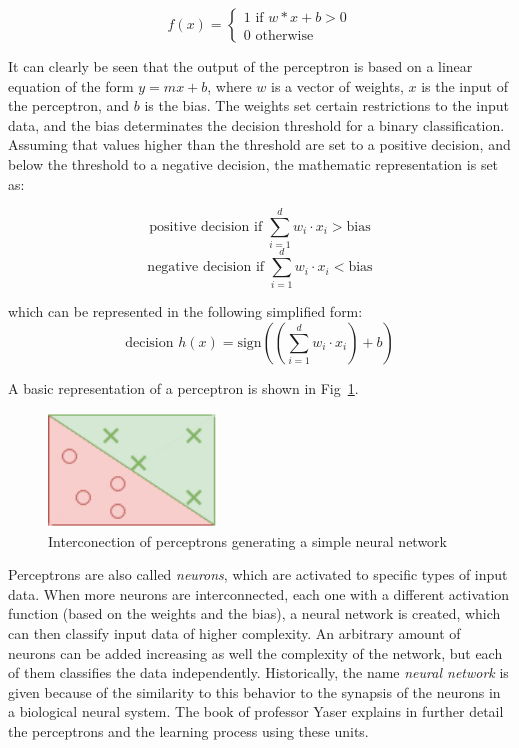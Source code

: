 \begin{equation}
    f(x) =
    \begin{cases}
        1 \text{ if } w*x + b > 0\\
        0 \text{ otherwise}
    \end{cases}
\end{equation}

It can clearly be seen that the output of the perceptron is based on a linear equation of the form \(y=mx+b\), where \(w\)  is a vector of weights, \(x\) is the input of the perceptron, and \(b\) is the bias. The weights set certain restrictions to the input data, and the bias determinates the decision threshold for a binary classification. Assuming that values higher than the threshold are set to a positive decision, and below the threshold to a negative decision, the mathematic representation is set as:

\begin{equation}
    \text{positive decision if } \sum_{i=1}^{d} w_i\cdot x_i > \text{bias}
\end{equation}
\begin{equation}
    \text{negative decision if } \sum_{i=1}^{d} w_i\cdot x_i < \text{bias}
\end{equation}

which can be represented in the following simplified form:
\begin{equation}
    \text{decision } h(x) = \text{sign}\left(  \left( \sum_{i=1}^{d} w_i\cdot x_i \right )+ b \right )
\end{equation}

A basic representation of a perceptron is shown in Fig~\ref{fig:perceptron}.

\begin{figure}[!htb]
    \centering
      \includegraphics[width=0.4\textwidth]{figures/perceptron}
      \caption{Interconection of perceptrons generating a simple neural network}
      \label{fig:perceptron}
\end{figure}

Perceptrons are also called \emph{neurons}, which are activated to specific types of input data. When more neurons are interconnected, each one with a different activation function (based on the weights and the bias), a neural network is created, which can then classify input data of higher complexity. An arbitrary amount of neurons can be added increasing as well the complexity of the network, but each of them classifies the data independently. Historically, the name \emph{neural network} is given because of the similarity to this behavior to the synapsis of the neurons in a biological neural system. The book of professor Yaser \cite{Yaser} explains in further detail the perceptrons and the learning process using these units.


